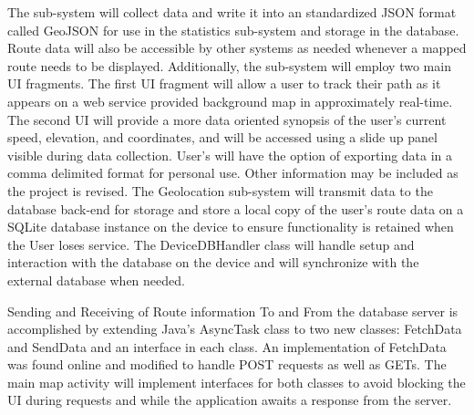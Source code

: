 ﻿\documentclass{article}
\begin{document}
The sub-system will collect data and write it into an standardized JSON format called GeoJSON for use in the statistics sub-system and storage in the database. Route data will also be accessible by other systems as needed whenever a mapped route needs to be displayed. Additionally, the sub-system will employ two main UI fragments. The first UI fragment will allow a user to track their path as it appears on a web service provided background map in approximately real-time. The second UI will provide a more data oriented synopsis of the user’s current speed, elevation, and coordinates, and will be accessed using a slide up panel visible during data collection. User’s will have the option of exporting data in a comma delimited format for personal use. Other information may be included as the project is revised. The Geolocation sub-system will transmit data to the database back-end for storage and store a local copy of the user's route data on a SQLite database instance on the device to ensure functionality is retained when the User loses service. The DeviceDBHandler class will handle setup and interaction with the database on the device and will synchronize with the external database when needed.

Sending and Receiving of Route information To and From the database server is accomplished by extending Java's AsyncTask\cite{g_AsyncTask} class to two new classes: FetchData and SendData and an interface in each class. An implementation of FetchData was found online and modified to handle POST requests as well as GETs.\cite{g_asyncget} The main map activity will implement interfaces for both classes to avoid blocking the UI during requests and while the application awaits a response from the server.
\end{document}
